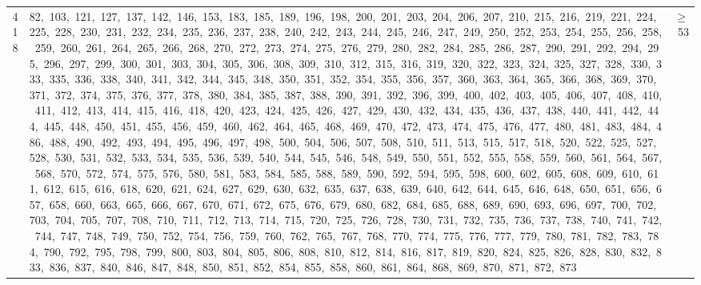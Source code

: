 \begin{longtable}{c|p{}|r}
418 & 82,\ 103,\ 121,\ 127,\ 137,\ 142,\ 146,\ 153,\ 183,\ 185,\ 189,\ 196,\ 198,\ 200,\ 201,\ 203,\ 204,\ 206,\ 207,\ 210,\ 215,\ 216,\ 219,\ 221,\ 224,\ 225,\ 228,\ 230,\ 231,\ 232,\ 234,\ 235,\ 236,\ 237,\ 238,\ 240,\ 242,\ 243,\ 244,\ 245,\ 246,\ 247,\ 249,\ 250,\ 252,\ 253,\ 254,\ 255,\ 256,\ 258,\ 259,\ 260,\ 261,\ 264,\ 265,\ 266,\ 268,\ 270,\ 272,\ 273,\ 274,\ 275,\ 276,\ 279,\ 280,\ 282,\ 284,\ 285,\ 286,\ 287,\ 290,\ 291,\ 292,\ 294,\ 295,\ 296,\ 297,\ 299,\ 300,\ 301,\ 303,\ 304,\ 305,\ 306,\ 308,\ 309,\ 310,\ 312,\ 315,\ 316,\ 319,\ 320,\ 322,\ 323,\ 324,\ 325,\ 327,\ 328,\ 330,\ 333,\ 335,\ 336,\ 338,\ 340,\ 341,\ 342,\ 344,\ 345,\ 348,\ 350,\ 351,\ 352,\ 354,\ 355,\ 356,\ 357,\ 360,\ 363,\ 364,\ 365,\ 366,\ 368,\ 369,\ 370,\ 371,\ 372,\ 374,\ 375,\ 376,\ 377,\ 378,\ 380,\ 384,\ 385,\ 387,\ 388,\ 390,\ 391,\ 392,\ 396,\ 399,\ 400,\ 402,\ 403,\ 405,\ 406,\ 407,\ 408,\ 410,\ 411,\ 412,\ 413,\ 414,\ 415,\ 416,\ 418,\ 420,\ 423,\ 424,\ 425,\ 426,\ 427,\ 429,\ 430,\ 432,\ 434,\ 435,\ 436,\ 437,\ 438,\ 440,\ 441,\ 442,\ 444,\ 445,\ 448,\ 450,\ 451,\ 455,\ 456,\ 459,\ 460,\ 462,\ 464,\ 465,\ 468,\ 469,\ 470,\ 472,\ 473,\ 474,\ 475,\ 476,\ 477,\ 480,\ 481,\ 483,\ 484,\ 486,\ 488,\ 490,\ 492,\ 493,\ 494,\ 495,\ 496,\ 497,\ 498,\ 500,\ 504,\ 506,\ 507,\ 508,\ 510,\ 511,\ 513,\ 515,\ 517,\ 518,\ 520,\ 522,\ 525,\ 527,\ 528,\ 530,\ 531,\ 532,\ 533,\ 534,\ 535,\ 536,\ 539,\ 540,\ 544,\ 545,\ 546,\ 548,\ 549,\ 550,\ 551,\ 552,\ 555,\ 558,\ 559,\ 560,\ 561,\ 564,\ 567,\ 568,\ 570,\ 572,\ 574,\ 575,\ 576,\ 580,\ 581,\ 583,\ 584,\ 585,\ 588,\ 589,\ 590,\ 592,\ 594,\ 595,\ 598,\ 600,\ 602,\ 605,\ 608,\ 609,\ 610,\ 611,\ 612,\ 615,\ 616,\ 618,\ 620,\ 621,\ 624,\ 627,\ 629,\ 630,\ 632,\ 635,\ 637,\ 638,\ 639,\ 640,\ 642,\ 644,\ 645,\ 646,\ 648,\ 650,\ 651,\ 656,\ 657,\ 658,\ 660,\ 663,\ 665,\ 666,\ 667,\ 670,\ 671,\ 672,\ 675,\ 676,\ 679,\ 680,\ 682,\ 684,\ 685,\ 688,\ 689,\ 690,\ 693,\ 696,\ 697,\ 700,\ 702,\ 703,\ 704,\ 705,\ 707,\ 708,\ 710,\ 711,\ 712,\ 713,\ 714,\ 715,\ 720,\ 725,\ 726,\ 728,\ 730,\ 731,\ 732,\ 735,\ 736,\ 737,\ 738,\ 740,\ 741,\ 742,\ 744,\ 747,\ 748,\ 749,\ 750,\ 752,\ 754,\ 756,\ 759,\ 760,\ 762,\ 765,\ 767,\ 768,\ 770,\ 774,\ 775,\ 776,\ 777,\ 779,\ 780,\ 781,\ 782,\ 783,\ 784,\ 790,\ 792,\ 795,\ 798,\ 799,\ 800,\ 803,\ 804,\ 805,\ 806,\ 808,\ 810,\ 812,\ 814,\ 816,\ 817,\ 819,\ 820,\ 824,\ 825,\ 826,\ 828,\ 830,\ 832,\ 833,\ 836,\ 837,\ 840,\ 846,\ 847,\ 848,\ 850,\ 851,\ 852,\ 854,\ 855,\ 858,\ 860,\ 861,\ 864,\ 868,\ 869,\ 870,\ 871,\ 872,\ 873 & $\ge$ 53 \\

\end{longtable}
